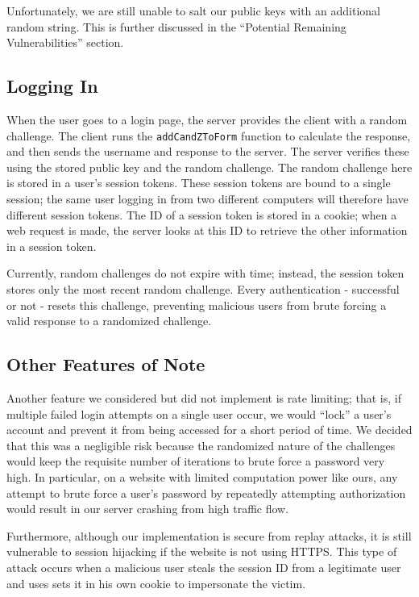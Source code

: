 \documentclass[11pt]{article}
\begin{document}
Unfortunately, we are still unable to salt our public keys with an additional random string. This is further discussed in the ``Potential Remaining Vulnerabilities'' section.

\subsection{Logging In}

When the user goes to a login page, the server provides the client with a random challenge. The client runs the \texttt{addCandZToForm} function to calculate the response, and then sends the username and response to the server. The server verifies these using the stored public key and the random challenge.
The random challenge here is stored in a user’s session tokens. These session tokens are bound to a single session; the same user logging in from two different computers will therefore have different session tokens. The ID of a session token is stored in a cookie; when a web request is made, the server looks at this ID to retrieve the other information in a session token.

Currently, random challenges do not expire with time; instead, the session token stores only the most recent random challenge. Every authentication - successful or not - resets this challenge, preventing malicious users from brute forcing a valid response to a randomized challenge.

\subsection{Other Features of Note}

Another feature we considered but did not implement is rate limiting; that is, if multiple failed login attempts on a single user occur, we would “lock” a user’s account and prevent it from being accessed for a short period of time. We decided that this was a negligible risk because the randomized nature of the challenges would keep the requisite number of iterations to brute force a password very high. In particular, on a website with limited computation power like ours, any attempt to brute force a user’s password by repeatedly attempting authorization would result in our server crashing from high traffic flow.

Furthermore, although our implementation is secure from replay attacks, it is still vulnerable to session hijacking if the website is not using HTTPS. This type of attack occurs when a malicious user steals the session ID from a legitimate user and uses sets it in his own cookie to impersonate the victim.
\end{document}
